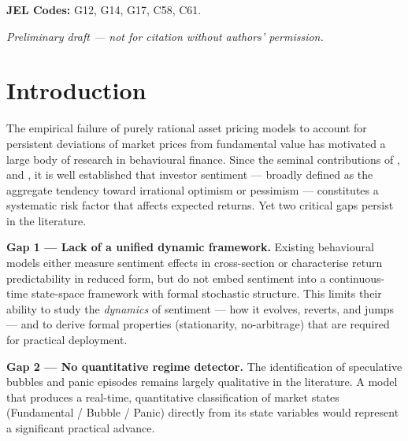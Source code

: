 \documentclass[12pt,a4paper]{article}
\theoremstyle{definition}
\theoremstyle{remark}
\begin{document}
\begin{titlepage}
\begin{center}
\begin{mdframed}
    \vspace{6pt}
    \noindent\textbf{JEL Codes:} G12, G14, G17, C58, C61.
    \end{mdframed}

    \vfill
    {\small\textcolor{zewugray}{
      \emph{Preliminary draft --- not for citation without authors'
      permission.}}}
  \end{center}
\end{titlepage}

\tableofcontents
\newpage

\section{Introduction}
\label{sec:intro}

The empirical failure of purely rational asset pricing models to account
for persistent deviations of market prices from fundamental value has
motivated a large body of research in behavioural finance. Since the
seminal contributions of \citet{shiller1981}, \citet{depond1985} and
\citet{barberis1998}, it is well established that investor sentiment ---
broadly defined as the aggregate tendency toward irrational optimism or
pessimism --- constitutes a systematic risk factor that affects expected
returns. Yet two critical gaps persist in the literature.

\textbf{Gap 1 --- Lack of a unified dynamic framework.} Existing
behavioural models either measure sentiment effects in cross-section
\citep{baker2006} or characterise return predictability in reduced form,
but do not embed sentiment into a continuous-time state-space framework
with formal stochastic structure. This limits their ability to study
the \emph{dynamics} of sentiment --- how it evolves, reverts, and jumps
--- and to derive formal properties (stationarity, no-arbitrage) that
are required for practical deployment.

\textbf{Gap 2 --- No quantitative regime detector.} The identification
of speculative bubbles and panic episodes remains largely qualitative in
the literature. A model that produces a real-time, quantitative
classification of market states (Fundamental / Bubble / Panic) directly
from its state variables would represent a significant practical advance.
\end{document}
